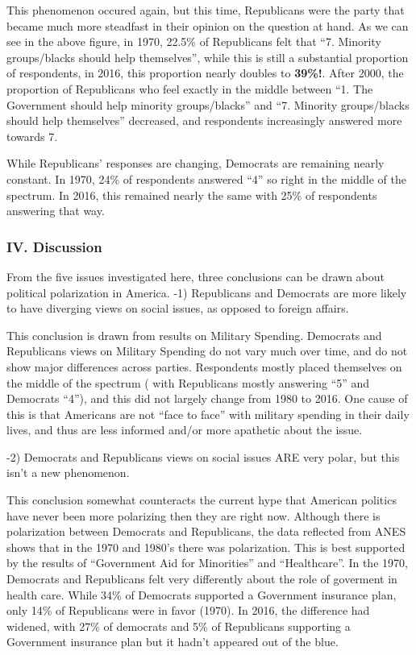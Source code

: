 \documentclass[
]{article}
\begin{document}
This phenomenon occured again, but this time, Republicans were the party
that became much more steadfast in their opinion on the question at
hand. As we can see in the above figure, in 1970, 22.5\% of Republicans
felt that ``7. Minority groups/blacks should help themselves'', while
this is still a substantial proportion of respondents, in 2016, this
proportion nearly doubles to \textbf{39\%!}. After 2000, the proportion
of Republicans who feel exactly in the middle between ``1. The
Government should help minority groups/blacks'' and ``7. Minority
groups/blacks should help themselves'' decreased, and respondents
increasingly answered more towards 7.

While Republicans' responses are changing, Democrats are remaining
nearly constant. In 1970, 24\% of respondents answered ``4'' so right in
the middle of the spectrum. In 2016, this remained nearly the same with
25\% of respondents answering that way.

\hypertarget{iv.-discussion}{%
\subsubsection{\texorpdfstring{\textbf{IV. Discussion
}}{IV. Discussion }}\label{iv.-discussion}}

From the five issues investigated here, three conclusions can be drawn
about political polarization in America. -1) Republicans and Democrats
are more likely to have diverging views on social issues, as opposed to
foreign affairs.

This conclusion is drawn from results on Military Spending. Democrats
and Republicans views on Military Spending do not vary much over time,
and do not show major differences across parties. Respondents mostly
placed themselves on the middle of the spectrum ( with Republicans
mostly answering ``5'' and Democrats ``4''), and this did not largely
change from 1980 to 2016. One cause of this is that Americans are not
``face to face'' with military spending in their daily lives, and thus
are less informed and/or more apathetic about the issue.

-2) Democrats and Republicans views on social issues ARE very polar, but
this isn't a new phenomenon.

This conclusion somewhat counteracts the current hype that American
politics have never been more polarizing then they are right now.
Although there is polarization between Democrats and Republicans, the
data reflected from ANES shows that in the 1970 and 1980's there was
polarization. This is best supported by the results of ``Government Aid
for Minorities'' and ``Healthcare''. In the 1970, Democrats and
Republicans felt very differently about the role of goverment in health
care. While 34\% of Democrats supported a Government insurance plan,
only 14\% of Republicans were in favor (1970). In 2016, the difference
had widened, with 27\% of democrats and 5\% of Republicans supporting a
Government insurance plan but it hadn't appeared out of the blue.
\end{document}

